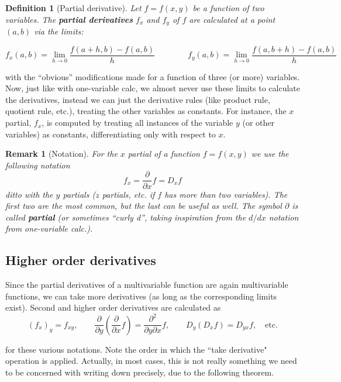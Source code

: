 \documentclass[12pt]{article}
\numberwithin{equation}{subsection}
\numberwithin{figure}{subsection}
\newtheorem{defn}[subsection]{Definition}
\theoremstyle{note}
\newtheorem{remark}[subsection]{Remark}
\begin{document}
{\begin{defn}[Partial derivative] Let $f=f(x,y)$ be a function of two variables. The \textbf{partial derivatives} $f_x$ and $f_y$ of $f$ are calculated at a point $(a,b)$ via the limits:

\begin{equation} 
	f_x(a,b)=\lim_{h\to 0} \dfrac{f(a+h,b)-f(a,b)}{h} \qquad \qquad f_y(a,b)=\lim_{h\to 0} \dfrac{f(a, b+h)-f(a,b)}{h} \label{partials}
\end{equation}
\end{defn}

with the ``obvious'' modifications made for a function of three (or more) variables. Now, just like with one-variable calc, we almost never use these limits to calculate the derivatives, instead we can just the derivative rules (like product rule, quotient rule, etc.), treating the other variables as constants. For instance, the $x$ partial, $f_x$, is computed by treating all instances of the variable $y$ (or other variables) as constants, differentiating only with respect to $x$.

\begin{remark}[Notation] For the $x$ partial of a function $f=f(x,y)$ we use the following notation \begin{equation} f_x= \dfrac{\partial}{\partial x} f=D_x f\end{equation} ditto with the $y$ partials ($z$ partials, etc. if $f$ has more than two variables). The first two are the most common, but the last can be useful as well. The symbol $\partial$ is called \textbf{partial} (or sometimes ``curly d'', taking inspiration from the $d/dx$ notation from one-variable calc.). \end{remark}

\subsection{Higher order derivatives} Since the partial derivatives of a multivariable function are again multivariable functions, we can take more derivatives (as long as the corresponding limits exist). Second and higher order derivatives are calculated as \begin{equation} (f_x)_y=f_{xy},\qquad \dfrac{\partial }{\partial y} \left(\dfrac{\partial }{\partial x}f\right)=\dfrac{\partial^2 }{\partial y \partial x}f, \qquad D_y \left(D_x f\right)=D_{yx}f, \quad \text{etc.}\end{equation}


for these various notations. Note the order in which the ``take derivative" operation is applied. Actually, in most cases, this is not really something we need to be concerned with writing down precisely, due to the following theorem.

}
\end{document}
